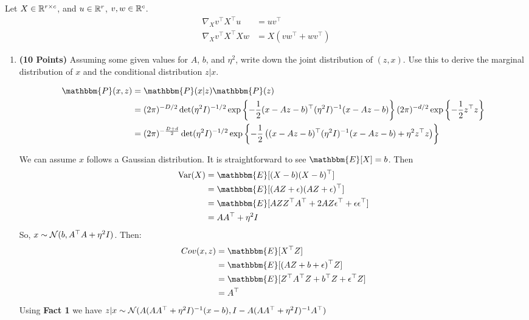 \begin{fact}
Let $X\in \mathbb{R}^{r\times c}$, and $u\in \mathbb{R}^r$, $v,w \in \mathbb{R}^c$.
\begin{align*}
\nabla_X v^\top X^\top u &= uv^\top \\
\nabla_X v^\top X^\top X w &= X(vw^\top + wv^\top)
\end{align*}
\end{fact}
\vspace{0.1in}

\begin{enumerate}
\item \textbf{(10 Points)}
Assuming some given values for $A$, $b$, and $\eta^2$, write down the joint distribution of $(z,x)$. Use this to derive the marginal
distribution of $x$ and the conditional distribution $z|x$. 

\begin{soln}
  $$
  \begin{aligned}
    \mathbbm{P}(x, z) & = \mathbbm{P}(x \vert z) \mathbbm{P}(z) \\
    & = (2 \pi)^{-D/2} \det(\eta^2 I)^{-1/2} \exp\left\{-\frac{1}{2} (x - Az -  b)^\top (\eta^2 I)^{-1} (x - Az -b) \right\} (2 \pi)^{-d/2} \exp\left\{ -\frac{1}{2} z^\top z\right\} \\
    & = (2 \pi)^{-\frac{D + d}{2}} \det(\eta^2 I)^{-1/2} \exp\left\{-\frac{1}{2} \left((x - Az -  b)^\top (\eta^2 I)^{-1} (x - Az -b) + \eta^2 z^\top z\right) \right\}
  \end{aligned}
  $$

  We can assume $x$ follows a Gaussian distribution. 
  It is straightforward to see $\mathbbm{E}[X] = b$.
  Then 
  $$
  \begin{aligned}
    \text{Var}(X) & = \mathbbm{E}[(X-b) (X-b)^\top] \\
    & = \mathbbm{E}[(AZ + \epsilon) (AZ + \epsilon)^\top] \\
    & = \mathbbm{E}[AZZ^\top A^\top +2 AZ \epsilon^\top + \epsilon \epsilon^\top] \\
    & = AA^\top + \eta^2 I
  \end{aligned}
  $$
  So, $x \sim \mathcal{N}(b, A^\top A + \eta^2 I)$.
  Then:
  $$
  \begin{aligned}
    Cov(x, z) & = \mathbbm{E}[X^\top Z] \\
    & = \mathbbm{E}[(AZ + b + \epsilon)^\top Z] \\
    & = \mathbbm{E}[Z^\top A^\top Z + b^\top Z + \epsilon^\top Z] \\
    & = A^\top
  \end{aligned}
  $$
  Using \textbf{Fact 1} we have $z \vert x \sim \mathcal{N}(A(AA^\top + \eta^2 I)^{-1}(x-b), I - A(AA^\top + \eta^2 I)^{-1}A^\top)$
\end{soln}


\end{enumerate}

